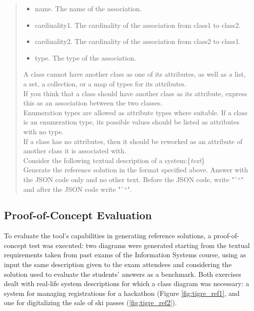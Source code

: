 \begin{quote}
\begin{itemize}
\begin{itemize}
                \item name. The name of the association.
                \item cardinality1. The cardinality of the association from class1 to class2.
                \item cardinality2. The cardinality of the association from class2 to class1.
                \item type. The type of the association.
            \end{itemize}
        \end{itemize}
        A class cannot have another class as one of its attributes, as well as a list, a set, a collection, or a map of types for its attributes.\\
        If you think that a class should have another class as its attribute, express this as an association between the two classes.\\
        Enumeration types are allowed as attribute types where suitable. If a class is an enumeration type, its possible values should be listed as attributes with no type.\\
        If a class has no attributes, then it should be reworked as an attribute of another class it is associated with.\\
        Consider the following textual description of a system:\{\textit{text}\}\\
        Generate the reference solution in the format specified above. Answer with the JSON code only and no other text. Before the JSON code, write "```" and after the JSON code write "```".
\end{quote}


\subsection{Proof-of-Concept Evaluation}

To evaluate the tool's capabilities in generating reference solutions, a proof-of-concept test was executed: two diagrams were generated starting from the textual requirements taken from past exams of the Information Systems course, using as input the same description given to the exam attendees and considering the solution used to evaluate the students' answers as a benchmark. Both exercises dealt with real-life system descriptions for which a class diagram was necessary: a system for managing registrations for a hackathon (Figure \ref{fig:tigre_ref1}, and one for digitalizing the sale of ski passes (\ref{fig:tigre_ref2}).

